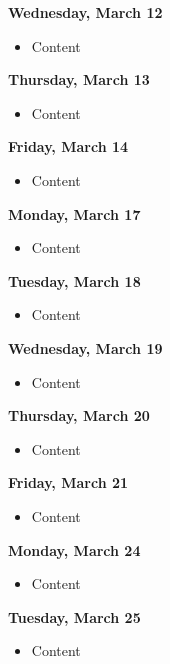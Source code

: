 \documentclass{article}
\begin{document}
\textbf{Wednesday, March 12}

\begin{itemize}
\item Content
\end{itemize}

\textbf{Thursday, March 13}

\begin{itemize}
\item Content
\end{itemize}

\textbf{Friday, March 14}

\begin{itemize}
\item Content
\end{itemize}

\textbf{Monday, March 17}

\begin{itemize}
\item Content
\end{itemize}

\textbf{Tuesday, March 18}

\begin{itemize}
\item Content
\end{itemize}

\textbf{Wednesday, March 19}

\begin{itemize}
\item Content
\end{itemize}

\textbf{Thursday, March 20}

\begin{itemize}
\item Content
\end{itemize}

\textbf{Friday, March 21}

\begin{itemize}
\item Content
\end{itemize}

\textbf{Monday, March 24}

\begin{itemize}
\item Content
\end{itemize}

\textbf{Tuesday, March 25}

\begin{itemize}
\item Content
\end{itemize}
\end{document}
